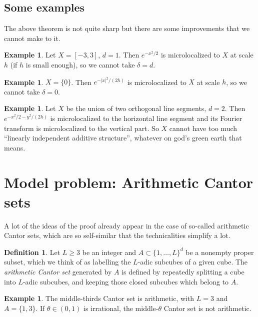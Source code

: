 \documentclass[reqno,12pt]{amsart}
\newcommand{\dfn}[1]{\emph{#1}\index{#1}}
\theoremstyle{definition}
\newtheorem{definition}[theorem]{Definition}
\newtheorem{example}[theorem]{Example}
\numberwithin{equation}{section}
\begin{document}
\subsection{Some examples}
The above theorem is not quite sharp but there are some improvements that we cannot make to it.

\begin{example}
    Let $X = [-3, 3]$, $d = 1$. Then $e^{-x^2/2}$ is microlocalized to $X$ at scale $h$ (if $h$ is small enough), so we cannot take $\delta = d$.
\end{example}

\begin{example}
    $X = \{0\}$. Then $e^{-|x|^2/(2h)}$ is microlocalized to $X$ at scale $h$, so we cannot take $\delta = 0$.
\end{example}

\begin{example}
    Let $X$ be the union of two orthogonal line segments, $d = 2$.
    Then $e^{-x^2/2-y^2/(2h)}$ is microlocalized to the horizontal line segment and its Fourier transform is microlocalized to the vertical part.
    So $X$ cannot have too much ``linearly independent additive structure'', whatever on god's green earth that means.
\end{example}

\section{Model problem: Arithmetic Cantor sets}
A lot of the ideas of the proof already appear in the case of so-called arithmetic Cantor sets, which are so self-similar that the technicalities simplify a lot.

\begin{definition}
    Let $L \geq 3$ be an integer and $A \subset \{1, \dots, L\}^d$ be a nonempty proper subset, which we think of as labelling the $L$-adic subcubes of a given cube.
    The \dfn{arithmetic Cantor set} generated by $A$ is defined by repeatedly splitting a cube into $L$-adic subcubes, and keeping those closed subcubes which belong to $A$.
\end{definition}

\begin{example}
    The middle-thirds Cantor set is arithmetic, with $L = 3$ and $A = \{1, 3\}$. If $\theta \in (0, 1)$ is irrational, the middle-$\theta$ Cantor set is not arithmetic.
\end{example}
\end{document}

